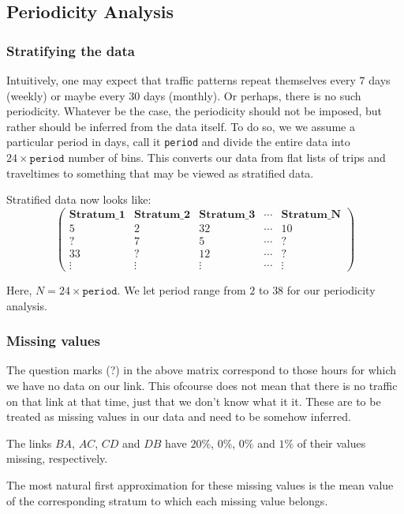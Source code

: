 \documentclass[10pt,a4paper]{amsart}
\begin{document}
\subsection{Periodicity Analysis}
\subsubsection{Stratifying the data}
Intuitively, one may expect that traffic patterns repeat themselves
every \(7\) days (weekly) or maybe every \(30\) days (monthly). Or
perhaps, there is no such periodicity. Whatever be the case, the
periodicity should not be imposed, but rather should be inferred
from the data itself. To do so, we we assume a particular period in
days, call it \texttt{period} and divide the entire data into
\(24\times\mathtt{period}\) number of bins. This converts our data
from flat lists of trips and traveltimes to something that may be
viewed as stratified data. 

Stratified data now looks like:
	\[ \left( \begin{array}{ccccc}
	\mathbf{Stratum\_1} & \mathbf{Stratum\_2} & \mathbf{Stratum\_3} & \cdots &
		\mathbf{Stratum\_N} \\
	5 & 2 & 32 & \cdots & 10 \\
	? & 7 & 5 & \cdots & ? \\
	33 & ? & 12 & \cdots & ? \\
	\vdots & \vdots & \vdots & \cdots & \vdots
	\end{array} \right)\]

Here, \(N=24\times\mathtt{period}\). We let period range from \(2\)
to \(38\) for our periodicity analysis.

\subsubsection{Missing values}
The question marks (?) in the above matrix correspond to those hours for which
we have no data on our link. This ofcourse does not mean that there is no
traffic on that link at that time, just that we don't know what it it. These
are to be treated as missing values in our data and need to be somehow
inferred.

The links \(BA\), \(AC\), \(CD\) and \(DB\) have \(20\%\), \(0\%\), \(0\%\)
and \(1\%\) of their values missing, respectively.

The most natural first approximation for these missing values is the mean
value of the corresponding stratum to which each missing value belongs.
\end{document}
